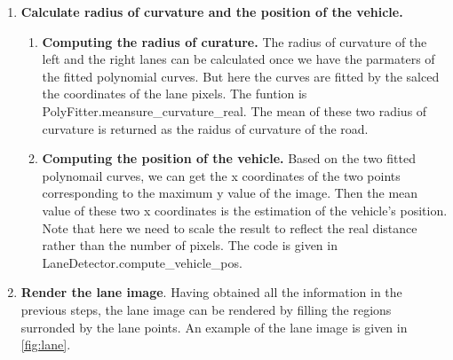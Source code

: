 \documentclass[12pt]{article}
\begin{document}
\begin{enumerate}
	
	\item \textbf{Calculate radius of curvature and the position of the vehicle.} 
		\begin{enumerate}
			\item \textbf{Computing the radius of curature.} The radius of curvature of the left and the right lanes can be calculated once we have the parmaters of the fitted polynomial curves. But here the curves are fitted by the salced the coordinates of the lane pixels. The funtion is PolyFitter.meansure\_curvature\_real. The mean of these two radius of curvature is returned as the raidus of curvature of the road. 
			
			\item \textbf{Computing the position of the vehicle.} Based on the two fitted polynomail curves, we can get the x coordinates of the two points corresponding to the maximum y value of the image. Then the mean value of these two x coordinates is the estimation of the vehicle's position. Note that here we need to scale the result to reflect the real distance rather than the number of pixels. The code is given in LaneDetector.compute\_vehicle\_pos.
		\end{enumerate}
	
	\item \textbf{Render the lane image}. Having obtained all the information in the previous steps, the lane image can be rendered by filling the regions surronded by the lane points. An example of the lane image is given in \ref{fig:lane}.
			
\end{enumerate}
\end{document}
